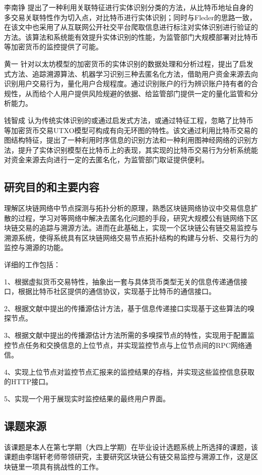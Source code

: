 \documentclass[supercite]{HustGraduPaper}
\theoremstyle{definition}
\begin{document}
李南铮\cite{李南铮2021比特币的网络交易特征分析及实体识别算法研究与设计} 提出了一种利用关联特征进行实体识别分类的方法，从比特币地址自身的多交易关联特性作为切入点，对比特币进行实体识别；同时与Fleder的思路一致，在该文中也采用了从互联网公开社交平台爬取信息进行标注对实体识别进行验证的方法。该算法和系统能有效提升实体识别的性能，为监管部门大规模部署对比特币等加密货币的监控提供了可能。

黄一\cite{黄一2021以太坊平台实体识别系统的研究与设计} 针对以太坊模型的加密货币的实体识别的数据处理和分析过程，提出了启发式方法、追踪溯源算法、机器学习识别三种去匿名化方法，借助用户资金来源去向识别用户交易行为，量化用户合规程度。通过识别账户的行为辨识账户持有者的合规性，从而给个人用户提供风险规避的依据、给监管部门提供一定的量化监管和分析能力。

钱智成\cite{钱智成2021比特币交易行为分析系统研究与设计} 认为传统实体识别的或通过启发式方法，或通过特征工程，忽略了比特币等加密货币交易UTXO模型可构成有向无环图的特性。该文通过利用比特币交易的图结构特征，提出了一种利用时序信息的识别方法和一种利用图神经网络的识别方法，提升了实体识别模型在比特币上的表现，其实现的比特币交易行为分析系统能对资金来源去向进行一定的去匿名化，为监管部门取证提供便利。

\subsection{研究目的和主要内容}
理解区块链网络中节点探测与拓扑分析的原理，熟悉区块链网络协议中交易信息扩散的过程，学习对等网络中解决去匿名化问题的手段，研究大规模公有链网络下区块链交易的追踪与溯源方法。进而在此基础上，实现一个区块链公有链交易监控与溯源系统，使得系统具有区块链网络交易节点拓扑结构的构建与分析、交易行为的监控与溯源的功能。

详细的工作包括：

1、根据虚拟货币交易特性，抽象出一套与具体货币类型无关的信息传递通信接口，根据比特币社区提供的通信协议，实现基于比特币的通信接口。

2、根据文献中提出的传播源估计方法，基于信息传递接口实现基于这些算法的嗅探节点。

3、根据文献中提出的传播源估计方法所需的多嗅探节点的特性，实现用于配置监控节点任务和交换信息的上位节点，并实现监控节点与上位节点间的RPC网络通信。

4、实现上位节点对监控节点汇报来的监控结果的存档，并实现这些监控信息获取的HTTP接口。

5、实现一个用于展现实时监控结果的最终用户界面。


\subsection{课题来源}
该课题是本人在第七学期（大四上学期）在毕业设计选题系统上所选择的课题，该课题由李瑞轩老师带领研究，主要研究区块链公有链交易监控与溯源工作，这是区块链里一项具有挑战性的工作。
\end{document}
